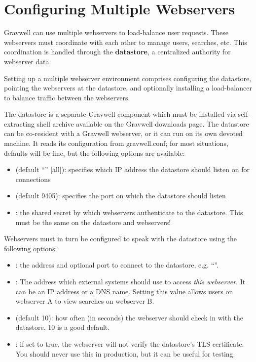 \section{Configuring Multiple Webservers}
Gravwell can use multiple webservers to load-balance user requests.
These webservers must coordinate with each other to manage users,
searches, etc. This coordination is handled through the \textbf{datastore}, a
centralized authority for webserver data.

Setting up a multiple webserver environment comprises configuring the
datastore, pointing the webservers at the datastore, and optionally
installing a load-balancer to balance traffic between the webservers.

The datastore is a separate Gravwell component which must be installed
via self-extracting shell archive available on the Gravwell downloads
page. The datastore can be co-resident with a Gravwell webserver, or it
can run on its own devoted machine. It reads its configuration from
gravwell.conf; for most situations, defaults will be fine, but the following
options are available:

\begin{itemize}
\item
   (default ``'' [all]): specifies which
  IP address the datastore should listen on for connections
\item
   (default 9405): specifies the port on which the
  datastore should listen
\item
  : the shared secret by which webservers authenticate to
  the datastore. This must be the same on the datastore and webservers!
\end{itemize}

Webservers must in turn be configured to speak with the datastore using
the following options:

\begin{itemize}
\item
  : the address and optional port to connect to the
  datastore, e.g. ``''.
\item
  : The address which external systems should use to
  access \emph{this webserver}. It can be an IP address or a DNS name.
  Setting this value allows users on webserver A to view searches on
  webserver B.
\item
   (default 10): how often (in seconds) the
  webserver should check in with the datastore. 10 is a good default.
\item
  : if set to true, the webserver will not verify the datastore's TLS certificate. You should never use this in production, but it can be useful for testing.
\end{itemize}

